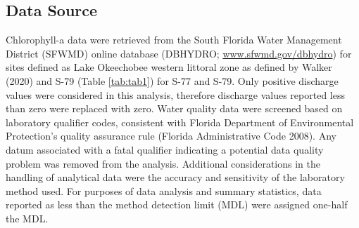 \documentclass[]{interact}
\theoremstyle{plain}%
\theoremstyle{definition}
\theoremstyle{remark}
\begin{document}
\hypertarget{data-source}{%
\subsection{Data Source}\label{data-source}}

Chlorophyll-a data were retrieved from the South Florida Water
Management District (SFWMD) online database (DBHYDRO;
\url{www.sfwmd.gov/dbhydro}) for sites defined as Lake Okeechobee
western littoral zone as defined by Walker (2020) and S-79 (Table
\ref{tab:tab1}) for S-77 and S-79. Only positive discharge values were
considered in this analysis, therefore discharge values reported less
than zero were replaced with zero. Water quality data were screened
based on laboratory qualifier codes, consistent with Florida Department
of Environmental Protection's quality assurance rule (Florida
Administrative Code 2008). Any datum associated with a fatal qualifier
indicating a potential data quality problem was removed from the
analysis. Additional considerations in the handling of analytical data
were the accuracy and sensitivity of the laboratory method used. For
purposes of data analysis and summary statistics, data reported as less
than the method detection limit (MDL) were assigned one-half the MDL.

\providecommand{\docline}[3]{\noalign{\global\setlength{\arrayrulewidth}{#1}}\arrayrulecolor[HTML]{#2}\cline{#3}}

\setlength{\tabcolsep}{2pt}

\renewcommand*{\arraystretch}{1.5}
\end{document}
